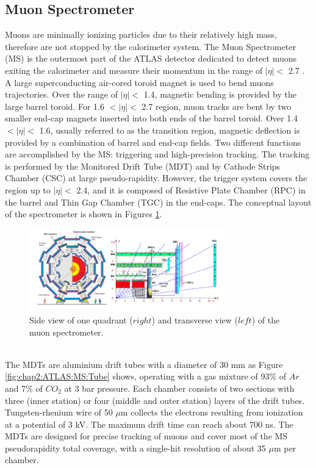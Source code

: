 \subsection{Muon Spectrometer}
\label{chap2:ATLAS:MS}
Muons are minimally ionizing particles due to their relatively high mass, therefore are not stopped by the calorimeter system. The Muon Spectrometer (MS) is the outermost part of the ATLAS detector dedicated to detect muons exiting the calorimeter and measure their momentum in the range of $|\eta| < $ 2.7 \cite{Muon_TDR}. A large superconducting air-cored toroid magnet is used to bend muons trajectories. Over the range of $|\eta| < $ 1.4, magnetic bending is provided by the large barrel toroid. For 1.6 $ < |\eta| < $ 2.7 region, muon tracks are bent by two smaller end-cap magnets inserted into both ends of the barrel toroid. Over 1.4 $ < |\eta| < $ 1.6, usually referred to as the transition region, magnetic deflection is provided by a combination of barrel and end-cap fields. Two different functions are accomplished by the MS: triggering and high-precision tracking. The tracking is performed by the Monitored Drift Tube (MDT) and by Cathode Strips Chamber (CSC) at large pseudo-rapidity. However, the trigger system covers the region up to $|\eta| < $ 2.4, and it is composed of Resistive Plate Chamber (RPC) in the barrel and Thin Gap Chamber (TGC) in the end-caps. The conceptual layout of the spectrometer is shown in Figures \ref{fig:chap2:ATLAS:MS}. \\
\begin{figure}[htbp]
    \centering
    \includegraphics[width=0.75\textwidth]{Ch2/Img/Muon.png}
    \caption{Side view of one quadrant ($right$) and transverse view ($left$) of the muon spectrometer.}
    \label{fig:chap2:ATLAS:MS}
\end{figure}
\\
The MDTs are aluminium drift tubes with a diameter of 30 mm as Figure \ref{fig:chap2:ATLAS:MS:Tube} shows, operating with a gas mixture of 93\% of $Ar$ and 7\% of $CO_2$ at 3 bar pressure. Each chamber consists of two sections with three (inner station) or four (middle and outer station) layers of the drift tubes. Tungsten-rhenium wire of 50 $\mu$m collects the electrons resulting from ionization at a potential of 3 kV. The maximum drift time can reach about 700 ns. The MDTs are designed for precise tracking of muons and cover most of the MS pseudorapidity total coverage, with a single-hit resolution of about 35 $\mu$m per chamber. \\
